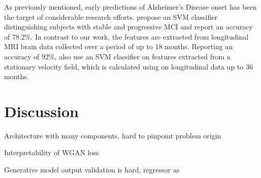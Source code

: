 As previously mentioned, early predictions of Alzheimer's Disease onset has been the target of considerable research efforts. \cite{thung2016identification} propose an SVM classifier distinguishing subjects with stable and progressive MCI and report an accuracy of 78.2\%. In contrast to our work, the features are extracted from longitudinal MRI brain data collected over a period of up to 18 months.
Reporting an accuracy of 92\%, \cite{sun2017detection} also use an SVM classifier on features extracted from a stationary velocity field, which is calculated using \cite{vercauteren2009diffeomorphic} on longitudinal data up to 36 months.

\chapter{Discussion}
Architecture with many components, hard to pinpoint problem origin

Interpretability of WGAN loss

Generative model output validation is hard, regressor as 
